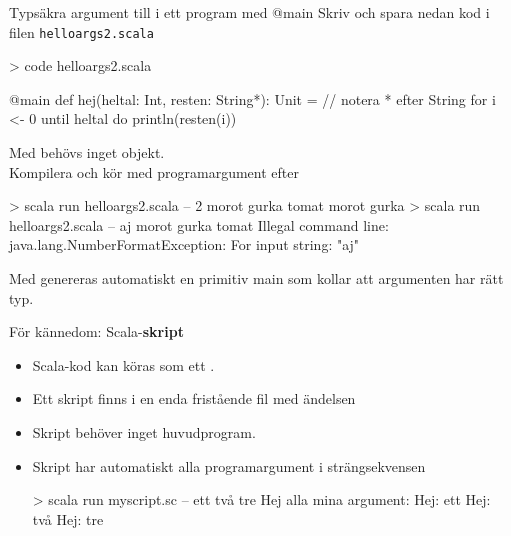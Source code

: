 \begin{Slide}{Typsäkra argument till i ett program med @main}
  \SlideFontSmall
Skriv och spara nedan kod i filen \texttt{helloargs2.scala}
\begin{REPLnonum}
> code helloargs2.scala
\end{REPLnonum}
\begin{Code}
@main def hej(heltal: Int, resten: String*): Unit =  // notera * efter String
  for i <- 0 until heltal do println(resten(i))
\end{Code}
Med  behövs inget objekt.\\
Kompilera och kör med programargument efter \code{--}
\begin{REPL}
> scala run helloargs2.scala -- 2 morot gurka tomat
morot
gurka
> scala run helloargs2.scala -- aj morot gurka tomat
Illegal command line: java.lang.NumberFormatException: For input string: "aj"
\end{REPL}
Med  genereras automatiskt en primitiv main som kollar att argumenten har rätt typ.
\end{Slide}


\begin{Slide}{För kännedom: Scala-\textbf{skript}}
\begin{itemize}
  \SlideFontSmall
  \item 
Scala-kod kan köras som ett .
\item Ett skript finns i en enda fristående fil med ändelsen 
\item Skript behöver inget huvudprogram. 
\item Skript har automatiskt alla programargument i strängsekvensen 

\begin{REPLnonum}
> scala run myscript.sc -- ett två tre
Hej alla mina argument:
Hej: ett
Hej: två
Hej: tre
\end{REPLnonum}
\end{itemize}
\end{Slide}




